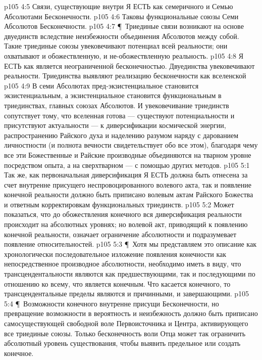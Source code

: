 \vs p105 4:5 \bibnobreakspace {} Связи, существующие внутри Я ЕСТЬ как семеричного и Семью Абсолютами Бесконечности.
\vs p105 4:6 \bibnobreakspace {} Таковы функциональные союзы Семи Абсолютов Бесконечности.
\vs p105 4:7 \P\ Триединые связи возникают на основе двуединств вследствие неизбежности объединения Абсолютов между собой. Такие триединые союзы увековечивают потенциал всей реальности; они охватывают и обожествленную, и не\hyp{}обожествленную реальность.
\vs p105 4:8 Я ЕСТЬ как  является неограниченной бесконечностью. Двуединства увековечивают  реальности. Триединства выявляют реализацию бесконечности как вселенской 
\vs p105 4:9 В семи Абсолютах пред\hyp{}экзистенциальное становится экзистенциальным, а экзистенциальное становится функциональным в триединствах, главных союзах Абсолютов. И увековечивание триединств сопутствует тому, что вселенная готова --- существуют потенциальности и присутствуют актуальности --- к диверсификации космической энергии, распространению Райского духа и наделению разумом наряду с дарованием личностности (и полнота вечности свидетельствует обо все этом), благодаря чему все эти Божественные и Райские производные объединяются на тварном уровне посредством опыта, а на сверхтварном --- с помощью других методов.
\vs p105 5:1 Так же, как первоначальная диверсификация Я ЕСТЬ должна быть отнесена за счет внутренне присущего неспровоцированного волевого акта, так и появление конечной реальности должно быть приписано волевым актам Райского Божества и ответным корректировкам функциональных триединств.
\vs p105 5:2 Может показаться, что до обожествления конечного вся диверсификация реальности происходит на абсолютных уровнях; но волевой акт, приводящий к появлению конечной реальности, означает ограничение абсолютности и подразумевает появление относительностей.
\vs p105 5:3 \P\ Хотя мы представляем это описание как хронологически последовательное изложение появления конечности как непосредственное производное абсолютности, необходимо иметь в виду, что трансцендентальности являются как предшествующими, так и последующими по отношению ко всему, что является конечным. Что касается конечного, то трансцендентальные пределы являются и причинными, и завершающими.
\vs p105 5:4 \P\ Возможности конечного внутренне присущи Бесконечности, но превращение возможности в вероятность и неизбежность должно быть приписано самосуществующей свободной воле Первоисточника и Центра, активирующего все триединые союзы. Только бесконечность воли Отца может так ограничить абсолютный уровень существования, чтобы выявить предельное или создать конечное.
